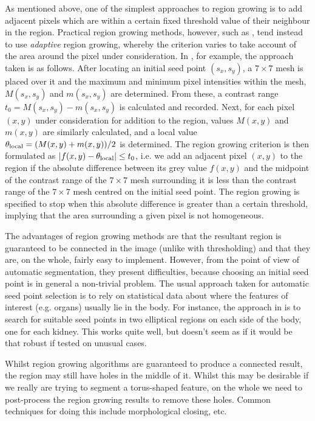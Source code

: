As mentioned above, one of the simplest approaches to region growing is to add adjacent pixels which are within a certain fixed threshold value of their neighbour in the region. Practical region growing methods, however, such as \cite{lin06,pohle01}, tend instead to use \emph{adaptive} region growing, whereby the criterion varies to take account of the area around the pixel under consideration. In \cite{lin06}, for example, the approach taken is as follows. After locating an initial seed point $(s_x, s_y)$, a $7 \times 7$ mesh is placed over it and the maximum and minimum pixel intensities within the mesh, $M(s_x, s_y)$ and $m(s_x, s_y)$ are determined. From these, a contrast range $t_0 = M(s_x, s_y) - m(s_x, s_y)$ is calculated and recorded. Next, for each pixel $(x,y)$ under consideration for addition to the region, values $M(x,y)$ and $m(x,y)$ are similarly calculated, and a local value $\theta_{\rm local} = (M(x,y) + m(x,y)) / 2$ is determined. The region growing criterion is then formulated as $|f(x,y) - \theta_{\rm local}| \le t_0$, i.e. we add an adjacent pixel $(x,y)$ to the region if the absolute difference between its grey value $f(x,y)$ and the midpoint of the contrast range of the $7 \times 7$ mesh surrounding it is less than the contrast range of the $7 \times 7$ mesh centred on the initial seed point. The region growing is specified to stop when this absolute difference is greater than a certain threshold, implying that the area surrounding a given pixel is not homogeneous.

The advantages of region growing methods are that the resultant region is guaranteed to be connected in the image (unlike with thresholding) and that they are, on the whole, fairly easy to implement. However, from the point of view of automatic segmentation, they present difficulties, because choosing an initial seed point is in general a non-trivial problem. The usual approach taken for automatic seed point selection is to rely on statistical data about where the features of interest (e.g. organs) usually lie in the body. For instance, the approach in \cite{lin06} is to search for suitable seed points in two elliptical regions on each side of the body, one for each kidney. This works quite well, but doesn't seem as if it would be that robust if tested on unusual cases.

Whilst region growing algorithms are guaranteed to produce a connected result, the region may still have holes in the middle of it. Whilst this may be desirable if we really are trying to segment a torus-shaped feature, on the whole we need to post-process the region growing results to remove these holes. Common techniques for doing this include morphological closing, etc.

